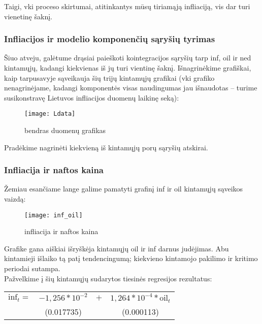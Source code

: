 \documentclass[a4paper]{article}
\begin{document}
\noindent Taigi, vki proceso skirtumai, atitinkantys mūsų tiriamąją infliaciją, vis dar turi vienetinę šaknį. 

\newpage \subsubsection{Infliacijos ir modelio komponenčių sąryšių tyrimas}

\noindent Šiuo atveju, galėtume drąsiai paieškoti kointegracijos sąryšių tarp inf, oil ir ned kintamųjų, kadangi kiekvienas iš jų turi vientinę šaknį. Išnagrinėkime grafiškai, kaip tarpusavyje sąveikauja šių trijų kintamųjų grafikai (vki grafiko nenagrinėjame, kadangi komponentės visas naudingumas jau išnaudotas – turime susikonstravę Lietuvos infliacijos duomenų laikinę seką): 

\begin{figure}[!h]
\centering
\texttt{[image: Ldata]}
\caption{bendras duomenų grafikas}
\end{figure}

\noindent Pradėkime nagrinėti kiekvieną iš kintamųjų porų sąryšių atskirai.

\newpage
\subsubsection*{Infliacija ir naftos kaina}

\noindent Žemiau esančiame lange galime pamatyti grafinį inf ir oil kintamųjų sąveikos vaizdą:

\begin{figure}[!h]
\centering
\texttt{[image: inf\_oil]}
\caption{infliacija ir naftos kaina}
\end{figure}

Grafike gana aiškiai išryškėja kintamųjų oil ir inf darnus judėjimas. Abu kintamieji išlaiko tą patį tendencingumą;  kiekvieno kintamojo pakilimo ir kritimo periodai sutampa.\\ Pažvelkime į šių kintamųjų sudarytos tiesinės regresijos rezultatus:

\begin{table}[!h]
\begin{center}
\begin{tabular}{cccc} 
$\text{inf}_t =$ & $-1,256*10^{-2}$ & $+$ & $1,264*10^{-4}*\text{oil}_t$ \\ 
  & (0.017735) && (0.000113) \\ 
\end{tabular} 
\end{center}
\end{table}
\end{document}
